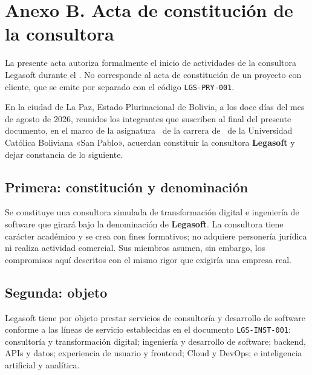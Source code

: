 
\section{Anexo B. Acta de constitución de la consultora}

\begin{nota}
La presente acta autoriza formalmente el inicio de actividades de la consultora
Legasoft durante el \lgSemestre. No corresponde al acta de constitución de un
proyecto con cliente, que se emite por separado con el código
\texttt{LGS-PRY-001}.
\end{nota}

En la ciudad de La Paz, Estado Plurinacional de Bolivia, a los doce días del mes
de agosto de 2026, reunidos los integrantes que suscriben al final del presente
documento, en el marco de la asignatura \lgMateria\ de la carrera de
\lgCarrera\ de la Universidad Católica Boliviana «San Pablo», acuerdan
constituir la consultora \textbf{Legasoft} y dejar constancia de lo siguiente.

\subsection{Primera: constitución y denominación}

Se constituye una consultora simulada de transformación digital e ingeniería de
software que girará bajo la denominación de \textbf{Legasoft}. La consultora
tiene carácter académico y se crea con fines formativos; no adquiere personería
jurídica ni realiza actividad comercial. Sus miembros asumen, sin embargo, los
compromisos aquí descritos con el mismo rigor que exigiría una empresa real.

\subsection{Segunda: objeto}

Legasoft tiene por objeto prestar servicios de consultoría y desarrollo de
software conforme a las líneas de servicio establecidas en el documento
\texttt{LGS-INST-001}: consultoría y transformación digital; ingeniería y
desarrollo de software; backend, APIs y datos; experiencia de usuario y
frontend; Cloud y DevOps; e inteligencia artificial y analítica.

